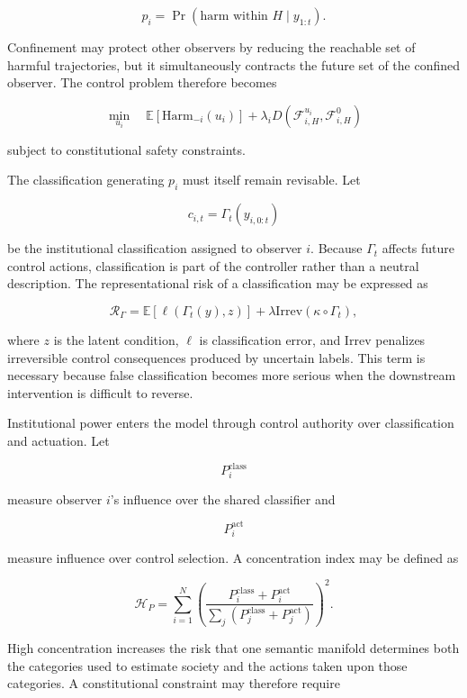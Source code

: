 \documentclass[12pt,a4paper]{article}
\begin{document}
\[
p_i
=
\Pr
\left(
\text{harm within }H
\mid
y_{1:t}
\right).
\]

Confinement may protect other observers by reducing the reachable set of harmful trajectories, but it simultaneously contracts the future set of the confined observer. The control problem therefore becomes

\[
\min_{u_i}
\quad
\mathbb{E}
\left[
\mathrm{Harm}_{-i}(u_i)
\right]
+
\lambda_i
D
\left(
\mathcal{F}_{i,H}^{u_i},
\mathcal{F}_{i,H}^{0}
\right)
\]

subject to constitutional safety constraints.

The classification generating \(p_i\) must itself remain revisable. Let

\[
c_{i,t}
=
\Gamma_t(y_{i,0:t})
\]

be the institutional classification assigned to observer \(i\). Because \(\Gamma_t\) affects future control actions, classification is part of the controller rather than a neutral description. The representational risk of a classification may be expressed as

\[
\mathcal{R}_{\Gamma}
=
\mathbb{E}
\left[
\ell
\left(
\Gamma_t(y),
z
\right)
\right]
+
\lambda
\mathrm{Irrev}
\left(
\kappa\circ\Gamma_t
\right),
\]

where \(z\) is the latent condition, \(\ell\) is classification error, and \(\mathrm{Irrev}\) penalizes irreversible control consequences produced by uncertain labels. This term is necessary because false classification becomes more serious when the downstream intervention is difficult to reverse.

Institutional power enters the model through control authority over classification and actuation. Let

\[
P_i^{\mathrm{class}}
\]

measure observer \(i\)'s influence over the shared classifier and

\[
P_i^{\mathrm{act}}
\]

measure influence over control selection. A concentration index may be defined as

\[
\mathcal{H}_{P}
=
\sum_{i=1}^{N}
\left(
\frac{
P_i^{\mathrm{class}}+P_i^{\mathrm{act}}
}{
\sum_j
(P_j^{\mathrm{class}}+P_j^{\mathrm{act}})
}
\right)^2.
\]

High concentration increases the risk that one semantic manifold determines both the categories used to estimate society and the actions taken upon those categories. A constitutional constraint may therefore require
\end{document}
